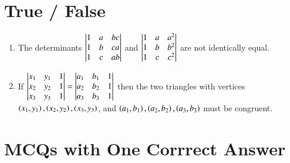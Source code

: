 \documentclass[journal,12pt,twocolumn]{IEEEtran}
\theoremstyle{remark}
\begin{document}
\section{True / False}

\begin{enumerate}[label=\arabic*.]
	\item The determinants $\begin{vmatrix}
			1 & a & bc \\
			1 & b & ca \\
			1 & c & ab
		\end{vmatrix}$ and $\begin{vmatrix}
			1 & a & a^2 \\
			1 & b & b^2 \\
			1 & c & c^2
		\end{vmatrix}$ are not identically equal.
		\hfill {}
	
	\item If $\begin{vmatrix}
			x_1 & y_1 & 1 \\
			x_2 & y_2 & 1 \\
			x_3 & y_3 & 1
		\end{vmatrix} = \begin{vmatrix}
			a_1 & b_1 & 1 \\
			a_2 & b_2 & 1 \\
			a_3 & b_3 & 1
		\end{vmatrix}$ then the two triangles with vertices	
		$\left(x_1, y_1\right), \left(x_2, y_2\right), \left(x_3, y_3\right)$,
		and $\left(a_1, b_1\right), \left(a_2, b_2\right), \left(a_3, b_3\right)$
		must be congruent.
		\hfill {}
\end{enumerate}

\section{MCQs with One Corrrect Answer}
\end{document}

